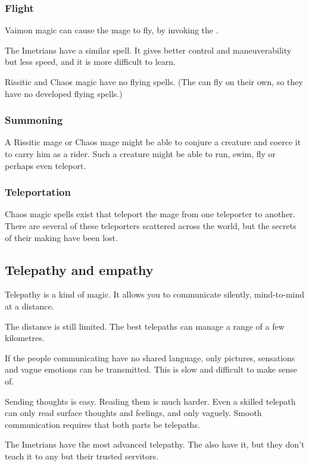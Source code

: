 \subsubsection{Flight}
Vaimon magic can cause the mage to fly, by invoking the \Sephirah{} \Atzirah{}. 

The Imetrians have a similar spell. It gives better control and maneuverability but less speed, and it is more difficult to learn. 

Rissitic and Chaos magic have no flying spells. (The \dragons{} can fly on their own, so they have no developed flying spells.) 

\subsubsection{Summoning}
A Rissitic mage or Chaos mage might be able to conjure a creature and coerce it to carry him as a rider. Such a creature might be able to run, swim, fly or perhaps even teleport. 

\subsubsection{Teleportation}
Chaos magic spells exist that teleport the mage from one teleporter to another. There are several of these teleporters scattered across the world, but the secrets of their making have been lost. 

\subsection{Telepathy and empathy}
Telepathy is a kind of magic. It allows you to communicate silently, mind-to-mind at a distance. 

The distance is still limited. The best telepaths can manage a range of a few kilometres. 

If the people communicating have no shared language, only pictures, sensations and vague emotions can be transmitted. This is slow and difficult to make sense of. 

Sending thoughts is easy. Reading them is much harder. Even a skilled telepath can only read surface thoughts and feelings, and only vaguely. Smooth communication requires that both parts be telepaths. 

The Imetrians have the most advanced telepathy. The \banes{} also have it, but they don't teach it to any but their trusted servitors. 



